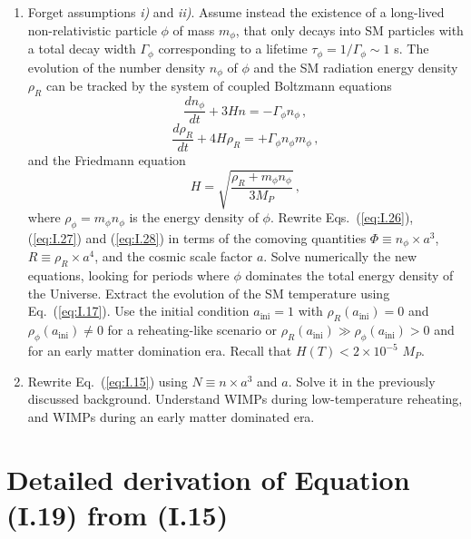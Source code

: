 \documentclass[11pt,a4paper]{article}
\begin{document}
\begin{enumerate}
    \item Forget assumptions \textit{i)} and \textit{ii)}. Assume instead the existence of a long-lived non-relativistic particle $\phi$ of mass $m_\phi$, that only decays into SM particles with a total decay width $\Gamma_\phi$ corresponding to a lifetime $\tau_\phi = 1/\Gamma_\phi \sim 1$ s. The evolution of the number density $n_\phi$ of $\phi$ and the SM radiation energy density $\rho_R$ can be tracked by the system of coupled Boltzmann equations
    \begin{equation} \label{eq:I.26}
        \frac{dn_\phi}{dt} + 3 H n = -\Gamma_\phi n_\phi \, ,
    \end{equation}
    \begin{equation} \label{eq:I.27}
        \frac{d\rho_R}{dt} + 4 H \rho_R = +\Gamma_\phi n_\phi m_\phi \, ,
    \end{equation}
    and the Friedmann equation
    \begin{equation} \label{eq:I.28}
        H = \sqrt{\frac{\rho_R + m_\phi n_\phi}{3 M_P}} \, ,
    \end{equation}
    where $\rho_\phi = m_\phi n_\phi$ is the energy density of $\phi$. Rewrite Eqs.~(\ref{eq:I.26}), (\ref{eq:I.27}) and (\ref{eq:I.28}) in terms of the comoving quantities $\Phi \equiv n_\phi \times a^3$, $R \equiv \rho_R \times a^4$, and the cosmic scale factor $a$. Solve numerically the new equations, looking for periods where $\phi$ dominates the total energy density of the Universe. Extract the evolution of the SM temperature using Eq.~(\ref{eq:I.17}). Use the initial condition $a_{\text{ini}} = 1$ with $\rho_R(a_{\text{ini}}) = 0$ and $\rho_\phi(a_{\text{ini}}) \neq 0$ for a reheating-like scenario or $\rho_R(a_{\text{ini}}) \gg \rho_\phi(a_{\text{ini}}) > 0$ and for an early matter domination era. Recall that $H(T) < 2 \times 10^{-5}$ $M_P$.
    
    \item Rewrite Eq.~(\ref{eq:I.15}) using $N \equiv n \times a^3$ and $a$. Solve it in the previously discussed background. Understand WIMPs during low-temperature reheating, and WIMPs during an early matter dominated era.
\end{enumerate}

\newpage
\appendix

\section{Detailed derivation of Equation (I.19) from (I.15)}
\label{sec:yieldBE}
\end{document}
